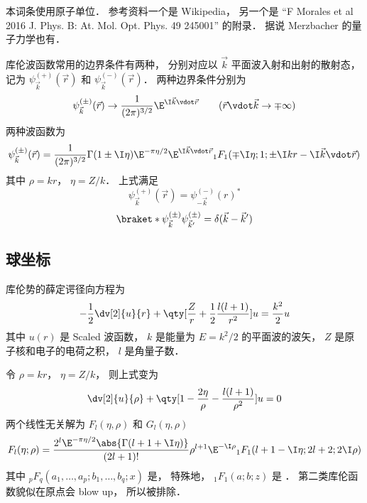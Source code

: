 
本词条使用原子单位． 参考资料一个是 Wikipedia， 另一个是 “F Morales et al 2016 J. Phys. B: At. Mol. Opt. Phys. 49 245001” 的附录． 据说 Merzbacher 的量子力学也有．

库伦波函数常用的边界条件有两种， 分别对应以 $\vec k$ 平面波入射和出射的散射态， 记为 $\psi_{\vec k}^{(+)}(\vec r)$ 和 $\psi_{\vec k}^{(-)}(\vec r)$． 两种边界条件分别为
\begin{equation}
\psi_{\vec k}^{(\pm)}(\vec r) \to \frac{1}{(2\pi)^{3/2}} \E^{\I\vec k\vdot\vec r}
\qquad
(\vec r\vdot \vec k \to \mp\infty)
\end{equation}
两种波函数为
\begin{equation}
\psi_{\vec k}^{(\pm)}(\vec r) = \frac{1}{(2\pi)^{3/2}} \Gamma(1\pm \I\eta)\E^{-\pi\eta/2} \E^{\I\vec k\vdot\vec r} {_1F_1}(\mp\I\eta; 1; \pm\I kr - \I \vec k\vdot \vec r)
\end{equation}
其中 $\rho = kr$， $\eta = Z/k$． 上式满足
\begin{equation}
\psi_{\vec k}^{(+)}(\vec r) = \psi_{-\vec k}^{(-)}(r)^*
\end{equation}
\begin{equation}
\braket*{\psi_{\vec k}^{(\pm)}}{\psi_{\vec k'}^{(\pm)}} = \delta(\vec k - \vec k')
\end{equation}

\subsection{球坐标}
库伦势的薛定谔径向方程为
\begin{equation}
-\frac12 \dv[2]{u}{r} + \qty[\frac{Z}{r} + \frac12 \frac{l(l+1)}{r^2}]u = \frac{k^2}{2}u
\end{equation}
其中 $u(r)$ 是 Scaled 波函数， $k$ 是能量为 $E = k^2/2$ 的平面波的波矢， $Z$ 是原子核和电子的电荷之积， $l$ 是角量子数．

令 $\rho = kr$， $\eta = Z/k$， 则上式变为
\begin{equation}
\dv[2]{u}{\rho} + \qty[1 - \frac{2\eta}{\rho} - \frac{l(l+1)}{\rho^2}]u = 0
\end{equation}
两个线性无关解为 $F_l(\eta, \rho)$ 和  $G_l(\eta, \rho)$
\begin{equation}
F_l(\eta; \rho) = \frac{2^l \E^{-\pi\eta/2} \abs{\Gamma(l+1+\I\eta)}}{(2l+1)!}
\rho^{l+1} \E^{-\I\rho} {_1F_1}(l+1-\I\eta; 2l+2; 2\I\rho)
\end{equation}
其中 $_p F_q(a_1,\dots,a_p; b_1,\dots,b_q; x)$ 是， 特殊地， $_1 F_1(a;b;z)$ 是 ． 第二类库伦函数貌似在原点会 blow up， 所以被排除．

